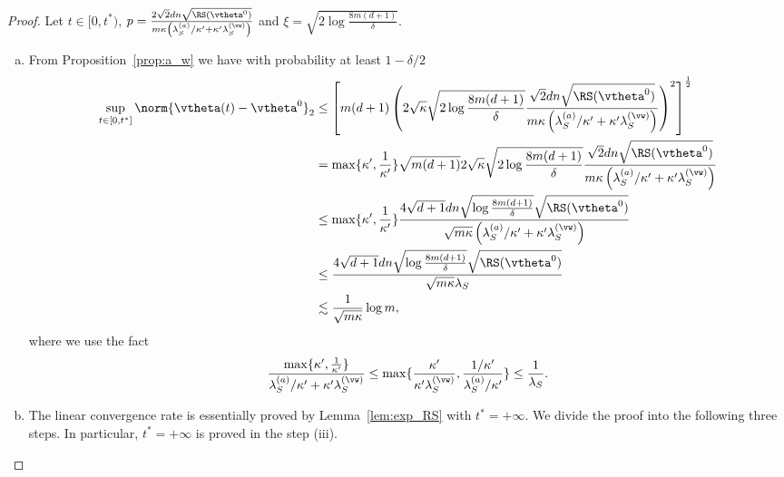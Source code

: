 \documentclass{article}
\begin{document}
\begin{proof}
    Let $t\in[0,t^*)$, $p=\frac{2\sqrt{2}dn\sqrt{\RS(\vtheta^0)}}{m\kappa\left(\lambda_S^{(a)}/\kappa'+\kappa'\lambda_S^{(\vw)}\right)}$ and $\xi=\sqrt{2\log\frac{8m(d+1)}{\delta}}$.
    \begin{enumerate}[(a)]
        \item From Proposition~\ref{prop:a_w} we have with probability at least $1-\delta/2$
              \begin{equation}
                  \begin{aligned}
                      \sup\limits_{t\in[0,t^*]}\norm{\vtheta(t)-\vtheta^0}_2
                       & \leq \left[m(d+1)\left(2\sqrt{\kappa}\sqrt{2\log\frac{8m(d+1)}{\delta}}\frac{\sqrt{2}dn\sqrt{\RS(\vtheta^0)}}{m\kappa\left(\lambda_S^{(a)}/\kappa'+\kappa'\lambda_S^{(\vw)}\right)}\right)^2\right]^{\frac{1}{2}} \\
                       & =\max\{\kappa',\frac{1}{\kappa'}\}\sqrt{m(d+1)}2\sqrt{\kappa}\sqrt{2\log\frac{8m(d+1)}{\delta}}\frac{\sqrt{2}dn\sqrt{\RS(\vtheta^0)}}{m\kappa\left(\lambda_S^{(a)}/\kappa'+\kappa'\lambda_S^{(\vw)}\right)}       \\
                       & \leq\max\{\kappa',\frac{1}{\kappa'}\}\frac{4\sqrt{d+1}dn\sqrt{\log\frac{8m(d+1)}{\delta}}\sqrt{\RS(\vtheta^0)}}{\sqrt{m\kappa}\left(\lambda_S^{(a)}/\kappa'+\kappa'\lambda_S^{(\vw)}\right)}                      \\
                       & \leq\frac{4\sqrt{d+1}dn\sqrt{\log\frac{8m(d+1)}{\delta}}\sqrt{\RS(\vtheta^0)}}{\sqrt{m\kappa}\lambda_S}                                                                                                           \\
                       & \lesssim \frac{1}{\sqrt{m\kappa}}\log m,
                  \end{aligned}
              \end{equation}
              where we use the fact
              \begin{equation}
                  \frac{\max\{\kappa',\frac{1}{\kappa'}\}}{\lambda_S^{(a)}/\kappa'+\kappa'\lambda_S^{(\vw)}}\leq\max\{\frac{\kappa'}{\kappa'\lambda_S^{(\vw)}},\frac{1/\kappa'}{\lambda_S^{(a)}/\kappa'}\}\leq\frac{1}{\lambda_S}.
              \end{equation}
        \item The linear convergence rate is essentially proved by Lemma~\ref{lem:exp_RS} with $t^* = +\infty$. We divide the proof into the following three steps. In particular, $t^*=+\infty$ is proved in the step (iii).

\end{enumerate}
\end{proof}
\end{document}
